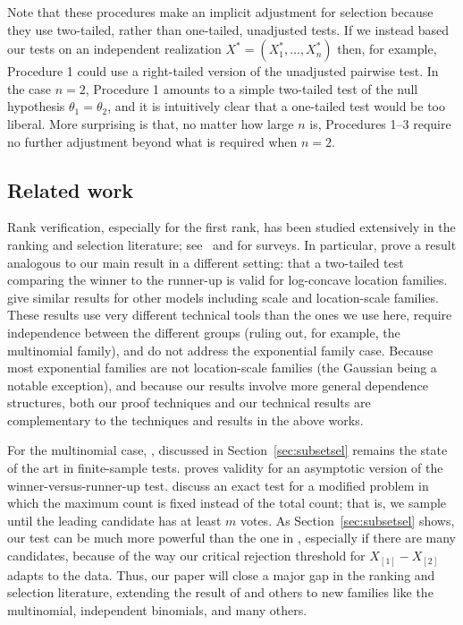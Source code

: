 \documentclass[11pt]{article}
\theoremstyle{definition}
\theoremstyle{custom}
\begin{document}
Note that these procedures make an implicit adjustment for selection because they use two-tailed, rather than one-tailed, unadjusted tests. If we instead based our tests on an independent realization $X^*= (X_1^*,\ldots,X_n^*)$ then, for example, Procedure 1 could use a right-tailed version of the unadjusted pairwise test. In the case $n = 2$, Procedure 1 amounts to a simple two-tailed test of the null hypothesis $\theta_1 = \theta_2$, and it is intuitively clear that a one-tailed test would be too liberal. More surprising is that, no matter how large $n$ is, Procedures 1--3 require no further adjustment beyond what is required when $n = 2$. 

\subsection{Related work}

Rank verification, especially for the first rank, has been studied extensively in the ranking and selection literature; see~\citet{Gupta:1971wk} and \citet{hsu1996multiple} for surveys. In particular, \citet{Gutmann:1987fk} prove a result analogous to our main result in a different setting: that a two-tailed test comparing the winner to the runner-up is valid for log-concave location families. \citet{Bofinger:1991hv, Maymin:1992fz, Karnnan:2009iv} give similar results for other models including scale and location-scale families. These results use very different technical tools than the ones we use here, require independence between the different groups (ruling out, for example, the multinomial family), and do not address the exponential family case. Because most exponential families are not location-scale families (the Gaussian being a notable exception), and because our results involve more general dependence structures, both our proof techniques and our technical results are complementary to the techniques and results in the above works.

For the multinomial case, \citet{Gupta:1967wg}, discussed in Section~\ref{sec:subsetsel} remains the state of the art in finite-sample tests. \citet{Nettleton:2009ht} proves validity for an asymptotic version of the winner-versus-runner-up test. \citet{Ng:2007cn} discuss an exact test for a modified problem in which the maximum count is fixed instead of the total count; that is, we sample until the leading candidate has at least $m$ votes. As Section~\ref{sec:subsetsel} shows, our test can be much more powerful than the one in \citet{Gupta:1967wg}, especially if there are many candidates, because of the way our critical rejection threshold for $X_{[1]}-X_{[2]}$ adapts to the data. Thus, our paper will close a major gap in the ranking and selection literature, extending the result of \citet{Gutmann:1987fk} and others to new families like the multinomial, independent binomials, and many others.
\end{document}
